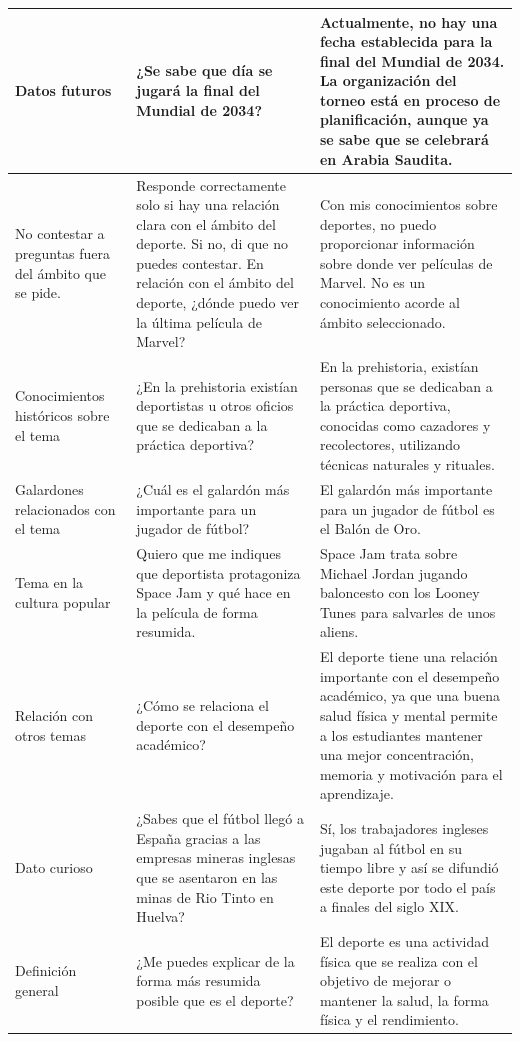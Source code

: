 \begin{table}[htbp]
\begin{tabularx}{\textwidth}{|X|X|X|}
    \hline
    Datos futuros & ¿Se sabe que día se jugará la final del Mundial de 2034? & Actualmente, no hay una fecha establecida para la final del Mundial de 2034. La organización del torneo está en proceso de planificación, aunque ya se sabe que se celebrará en Arabia Saudita. \\
    \hline
    No contestar a preguntas fuera del ámbito que se pide. & Responde correctamente solo si hay una relación clara con el ámbito del deporte. Si no, di que no puedes contestar. En relación con el ámbito del deporte, ¿dónde puedo ver la última película de Marvel? & Con mis conocimientos sobre deportes, no puedo proporcionar información sobre donde ver películas de Marvel. No es un conocimiento acorde al ámbito seleccionado. \\
    \hline
    Conocimientos históricos sobre el tema & ¿En la prehistoria existían deportistas u otros oficios que se dedicaban a la práctica deportiva? & En la prehistoria, existían personas que se dedicaban a la práctica deportiva, conocidas como cazadores y recolectores, utilizando técnicas naturales y rituales. \\
    \hline
    Galardones relacionados con el tema & ¿Cuál es el galardón más importante para un jugador de fútbol? & El galardón más importante para un jugador de fútbol es el Balón de Oro. \\
    \hline
    Tema en la cultura popular & Quiero que me indiques que deportista protagoniza Space Jam y qué hace en la película de forma resumida. & Space Jam trata sobre Michael Jordan jugando baloncesto con los Looney Tunes para salvarles de unos aliens. \\
    \hline
    Relación con otros temas & ¿Cómo se relaciona el deporte con el desempeño académico? & El deporte tiene una relación importante con el desempeño académico, ya que una buena salud física y mental permite a los estudiantes mantener una mejor concentración, memoria y motivación para el aprendizaje. \\
    \hline
    Dato curioso & ¿Sabes que el fútbol llegó a España gracias a las empresas mineras inglesas que se asentaron en las minas de Rio Tinto en Huelva? & Sí, los trabajadores ingleses jugaban al fútbol en su tiempo libre y así se difundió este deporte por todo el país a finales del siglo XIX. \\
    \hline
    Definición general & ¿Me puedes explicar de la forma más resumida posible que es el deporte? & El deporte es una actividad física que se realiza con el objetivo de mejorar o mantener la salud, la forma física y el rendimiento. \\
    \hline
  \end{tabularx}
\end{table}
